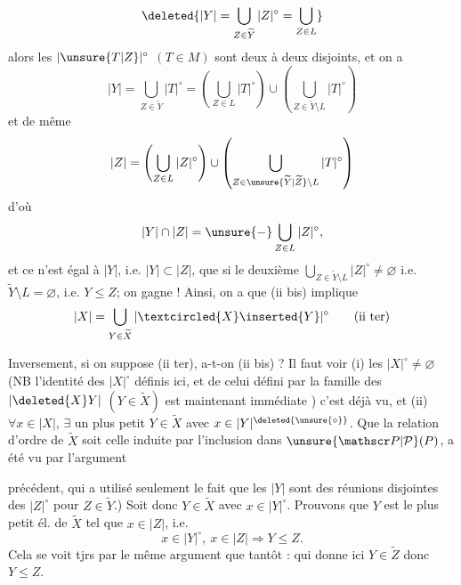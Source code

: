 \[
\deleted{|Y|=\bigcup_{Z\in\widetilde Y}|Z|^{\circ}=\bigcup_{Z\in L}}
\]
alors les  $|\unsure{T|Z}|^{\circ}$ $(T\in M)$ sont  deux à deux disjoints,  et on a
\[
|Y|=\bigcup_{Z\in\widetilde Y}|T|^{\circ}
=\left(\bigcup_{Z\in L}|T|^{\circ}\right)\cup
\left(\bigcup_{Z\in\widetilde Y\setminus L}|T|^{\circ}\right)
\]
et de même
\[
|Z|=\left(\bigcup_{Z\in L}|Z|^{\circ}\right)\cup
\left(\bigcup_{Z\in\unsure{\widetilde Y|\widetilde Z}\setminus L}|T|^{\circ}\right)
\]
d'où
\[
|Y|\cap|Z|=\unsure{-}\bigcup_{Z\in L}|Z|^{\circ},
\]
et ce n'est égal à $|Y|$, i.e. $|Y|\subset|Z|$, que si le deuxième  $\bigcup_{Z\in\widetilde Y\setminus L}|Z|^{\circ}\ne\varnothing$ i.e. $\widetilde Y\setminus L=\varnothing$, i.e. $Y\leq Z$;  on gagne ! Ainsi, on a que (ii bis)  implique
\[
|X|=\bigcup_{Y\in\widetilde X}|\textcircled{X}\inserted{Y}|^{\circ}\tag*{(ii ter)}
\]
\margin{$\unsure{(\star)}\longrightarrow$}

Inversement, si on suppose (ii ter), a-t-on (ii bis) ?
Il faut voir (i) les $|X|^{\circ}\ne\varnothing$ (NB l'identité des $|X|^{\circ}$ définis ici, et de celui défini par la famille des $|\deleted{X}Y|$ $(Y\in\widetilde X)$ est maintenant immédiate ) c'est déjà vu, et (ii) $\forall x\in|X|$, $\exists$ un plus petit $Y\in\widetilde X$ avec $x\in|Y|^{\deleted{\unsure{\circ}}}$. Que la relation d'ordre de $\widetilde X$ soit celle induite par l'inclusion dans $\unsure{\mathscr P|\mathcal P}(P)$, a été vu par l'argument

précédent, qui a utilisé seulement le fait que les $|Y|$ sont des réunions disjointes des $|Z|^{\circ}$ pour $Z\in\widetilde Y$.) 
Soit donc $Y\in\widetilde X$ avec $x\in|Y|^{\circ}$. Prouvons que $Y$ est le plus petit él. de $\widetilde X$ tel que $x\in|Z|$, i.e.
\[
x\in|Y|^{\circ},\ x\in|Z|\Longrightarrow Y\leq Z.
\]
Cela se voit tjrs par le même argument que tantôt : qui donne ici $Y\in\widetilde Z$ donc $Y\leq Z$.

